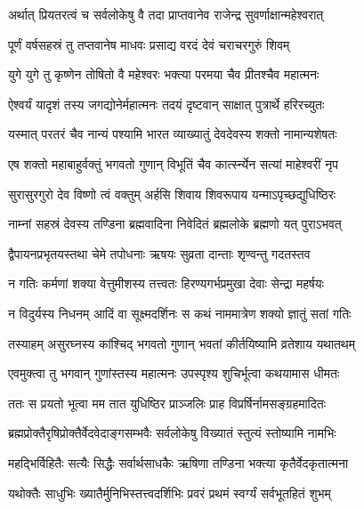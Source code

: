\twolineshloka
{अर्थात् प्रियतरत्वं च सर्वलोकेषु वै तदा}
{प्राप्तवानेव राजेन्द्र सुवर्णाक्षान्महेश्वरात्}%

\twolineshloka
{पूर्णं वर्षसहस्रं तु तप्तवानेष माधवः}
{प्रसाद्य वरदं देवं चराचरगुरुं शिवम्}%

\twolineshloka
{युगे युगे तु कृष्णेन तोषितो वै महेश्वरः}
{भक्त्या परमया चैव प्रीतश्चैव महात्मनः}%

\twolineshloka
{ऐश्वर्यं यादृशं तस्य जगद्योनेर्महात्मनः}
{तदयं दृष्टवान् साक्षात् पुत्रार्थे हरिरच्युतः}%

\twolineshloka
{यस्मात् परतरं चैव नान्यं पश्यामि भारत}
{व्याख्यातुं देवदेवस्य शक्तो नामान्यशेषतः}%

\twolineshloka
{एष शक्तो महाबाहुर्वक्तुं भगवतो गुणान्}
{विभूतिं चैव कार्त्स्न्येन सत्यां माहेश्वरीं नृप}%

\twolineshloka
{सुरासुरगुरो देव विष्णो त्वं वक्तुम् अर्हसि}
{शिवाय शिवरूपाय यन्माऽपृच्छद्युधिष्ठिरः}%

\twolineshloka
{नाम्नां सहस्रं देवस्य तण्डिना ब्रह्मवादिना}
{निवेदितं ब्रह्मलोके ब्रह्मणो यत् पुराऽभवत्}%

\twolineshloka
{द्वैपायनप्रभृतयस्तथा चेमे तपोधनाः}
{ऋषयः सुव्रता दान्ताः शृण्वन्तु गदतस्तव}%


\twolineshloka
{न गतिः कर्मणां शक्या वेत्तुमीशस्य तत्त्वतः}
{हिरण्यगर्भप्रमुखा देवाः सेन्द्रा महर्षयः}%

\twolineshloka
{न विदुर्यस्य निधनम् आदिं वा सूक्ष्मदर्शिनः}
{स कथं नाममात्रेण शक्यो ज्ञातुं सतां गतिः}%

\twolineshloka
{तस्याहम् असुरघ्नस्य कांश्चिद् भगवतो गुणान्}
{भवतां कीर्तयिष्यामि व्रतेशाय यथातथम्}%

\twolineshloka
{एवमुक्त्वा तु भगवान् गुणांस्तस्य महात्मनः}
{उपस्पृश्य शुचिर्भूत्वा कथयामास धीमतः}%

\twolineshloka
{ततः स प्रयतो भूत्वा मम तात युधिष्ठिर}
{प्राञ्जलिः प्राह विप्रर्षिर्नामसङ्ग्रहमादितः}%


\twolineshloka
{ब्रह्मप्रोक्तैरृषिप्रोक्तैर्वेदवेदाङ्गसम्भवैः}
{सर्वलोकेषु विख्यातं स्तुत्यं स्तोष्यामि नामभिः}%

\twolineshloka
{महद्भिर्विहितैः सत्यैः सिद्धैः सर्वार्थसाधकैः}
{ऋषिणा तण्डिना भक्त्या कृतैर्वेदकृतात्मना}%

\twolineshloka
{यथोक्तैः साधुभिः ख्यातैर्मुनिभिस्तत्त्वदर्शिभिः}
{प्रवरं प्रथमं स्वर्ग्यं सर्वभूतहितं शुभम्}%

